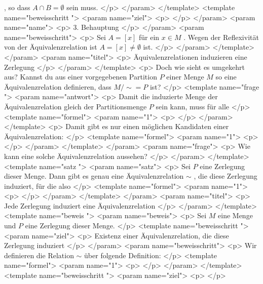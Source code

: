        , so dass
       $A\cap B=\emptyset$
       sein muss.
      </p>
     </param>
    </template>
    <template name="beweisschritt
 ">
     <param name="ziel">
      <p>
      </p>
     </param>
     <param name="name">
      <p>
       3. Behauptung
      </p>
     </param>
     <param name="beweisschritt">
      <p>
       Sei
       $A=[x]$
       für ein
       $x\in M$
       . Wegen der Reflexivität von der Äquivalenzrelation ist
       $A=[x]\ne \emptyset$
       ist.
      </p>
     </param>
    </template>
   </param>
   <param name="titel">
    <p>
     Äquivalenzrelationen induzieren eine Zerlegung
    </p>
   </param>
  </template>
  <p>
   Doch wie sieht es umgekehrt aus? Kannst du aus einer vorgegebenen Partition
   $P$
   einer Menge
   $M$
   so eine Äquivalenzrelation definieren, dass
   ${M/{\sim}}=P$
   ist?
  </p>
  <template name="frage
 ">
   <param name="antwort">
    <p>
     Damit die induzierte Menge der Äquivalenzrelation gleich der Partitionsmenge
     $P$
     sein kann, muss für alle
    </p>
    <template name="formel">
     <param name="1">
      <p>
      </p>
     </param>
    </template>
    <p>
     Damit gibt es nur einen möglichen Kandidaten einer Äquivalenzrelation:
    </p>
    <template name="formel">
     <param name="1">
      <p>
      </p>
     </param>
    </template>
   </param>
   <param name="frage">
    <p>
     Wie kann eine solche Äquivalenzrelation aussehen?
    </p>
   </param>
  </template>
  <template name="satz
 ">
   <param name="satz">
    <p>
     Sei
     $P$
     eine Zerlegung dieser Menge. Dann gibt es genau eine Äquivalenzrelation
     $\sim$
     , die diese Zerlegung induziert, für die also
    </p>
    <template name="formel">
     <param name="1">
      <p>
      </p>
     </param>
    </template>
   </param>
   <param name="titel">
    <p>
     Jede Zerlegung induziert eine Äquivalenzrelation
    </p>
   </param>
  </template>
  <template name="beweis
 ">
   <param name="beweis">
    <p>
     Sei
     $M$
     eine Menge und
     $P$
     eine Zerlegung dieser Menge.
    </p>
    <template name="beweisschritt
 ">
     <param name="ziel">
      <p>
       Existenz einer Äquivalenzrelation, die diese Zerlegung induziert
      </p>
     </param>
     <param name="beweisschritt">
      <p>
       Wir definieren die Relation
       $\sim$
       über folgende Definition:
      </p>
      <template name="formel">
       <param name="1">
        <p>
        </p>
       </param>
      </template>
      <template name="beweisschritt
 ">
       <param name="ziel">
        <p>
        </p>
